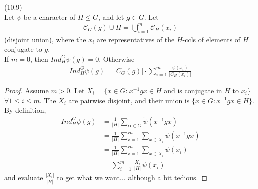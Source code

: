 \documentclass[a4paper]{article}
\begin{document}
\begin{lemma} (10.9)\\
Let $\psi$ be a character of $H \leq G$, and let $g \in G$. Let 
\begin{equation*}
\begin{aligned}
\mathcal{C}_G(g) \cup H = \bigcup_{i=1}^m \mathcal{C}_H (x_i)
\end{aligned}
\end{equation*}
(disjoint union), where the $x_i$ are representatives of the $H$-ccls of elements of $H$ conjugate to $g$.\\
If $m =0$, then $Ind_H^G \psi(g) = 0$. Otherwise
\begin{equation*}
\begin{aligned}
Ind_H^G \psi(g) = |C_G(g)| \cdot \sum_{i=1}^m \frac{\psi(x_i)}{|C_H(x_i)|}
\end{aligned}
\end{equation*}
\begin{proof}
Assume $m>0$. Let $X_i = \{x \in G: x^{-1} g x \in H$ and is conjugate in $H$ to $x_i\}$ $\forall 1 \leq i \leq m$.
The $X_i$ are pairwise disjoint, and their union is $\{x \in G: x^{-1} gx \in H\}$. By definition,
\begin{equation*}
\begin{aligned}
Ind_H^G \psi(g) &= \frac{1}{|H|} \sum_{\alpha \in G} \mathring{\psi}(x^{-1}gx)\\
&= \frac{1}{|H|} \sum_{i=1}^m \sum_{x \in X_i} \psi (x^{-1}gx)\\
&= \frac{1}{|H|} \sum_{i=1}^m \sum_{x \in X_i} \psi(x_i)\\
&= \sum_{i=1}^m \frac{|X_i|}{|H|} \psi(x_i)
\end{aligned}
\end{equation*}
and evaluate $\frac{|X_i|}{|H|}$ to get what we want... although a bit tedious.
\end{proof}
\end{lemma}

\end{document}

